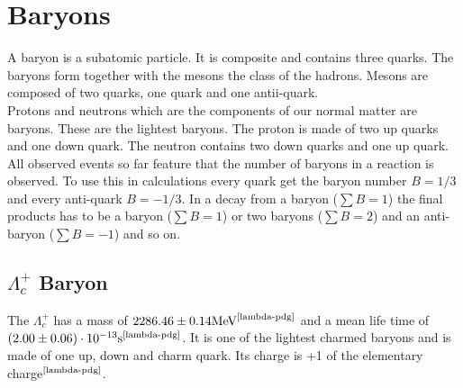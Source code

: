 \section{Baryons}
A baryon is a subatomic particle. It is composite and contains three quarks.
The baryons form together with the mesons the class of the hadrons. Mesons are 
composed of two quarks, one quark and one antii-quark.\\
Protons and neutrons which are the components of our normal matter are baryons. 
These are the lightest baryons. The proton is made of two up quarks and one down 
quark. The neutron contains two down quarks and one up quark.\\
All observed events so far feature that the number of baryons in a reaction is 
observed. To use this in calculations every quark get the baryon number \(B = 1/3\) and 
every anti-quark \(B = -1/3\). In a decay from a baryon (\(\sum B = 1\)) the final 
products has to be a baryon (\(\sum B = 1\)) or two baryons (\(\sum B = 2\)) 
and an anti-baryon (\(\sum B = -1\)) and so on. 

\subsection{\(\Lambda_c^+\) Baryon}
The \(\Lambda_c^+\) has a mass of \(2286.46 \pm 0.14 \text{MeV}^
{\text{\cite{lambda-pdg}}}\) and a mean life time of \(\left( 2.00 \pm 0.06\right)
\cdot 10^{-13} \text{s}^{\text{\cite{lambda-pdg}}}\). It is one of the lightest charmed 
baryons and is made of one up, down and charm quark. Its charge is +1 of the 
elementary charge\(^{\text{\cite{lambda-pdg}}}\).

